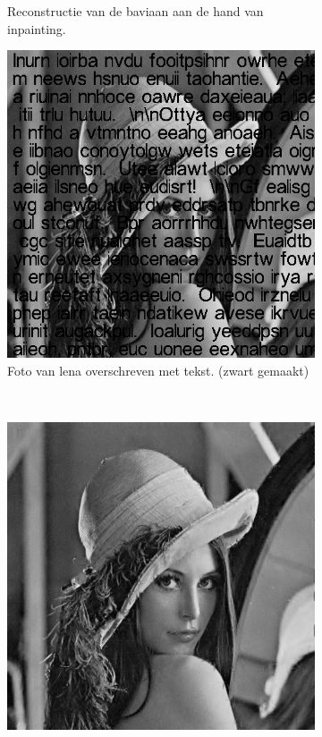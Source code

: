 \begin{figure}
\begin{subfigure}[b]{0.4\textwidth}
        \caption{Reconstructie van de baviaan aan de hand van inpainting. \\ }
        \label{fig:matti_fig_1d}
    \end{subfigure}
        \begin{subfigure}[b]{0.4\textwidth}
        \includegraphics[width=\textwidth]{../src/inpainting/lena_letters_broke_1}
        \caption{Foto van lena overschreven met tekst. (zwart gemaakt)}
        \label{fig:matti_fig_1e}
    \end{subfigure}
    ~ %
    \begin{subfigure}[b]{0.4\textwidth}
        \includegraphics[width=\textwidth]{../src/inpainting/lena_letters_fixed_1}

\end{subfigure}
\end{figure}
